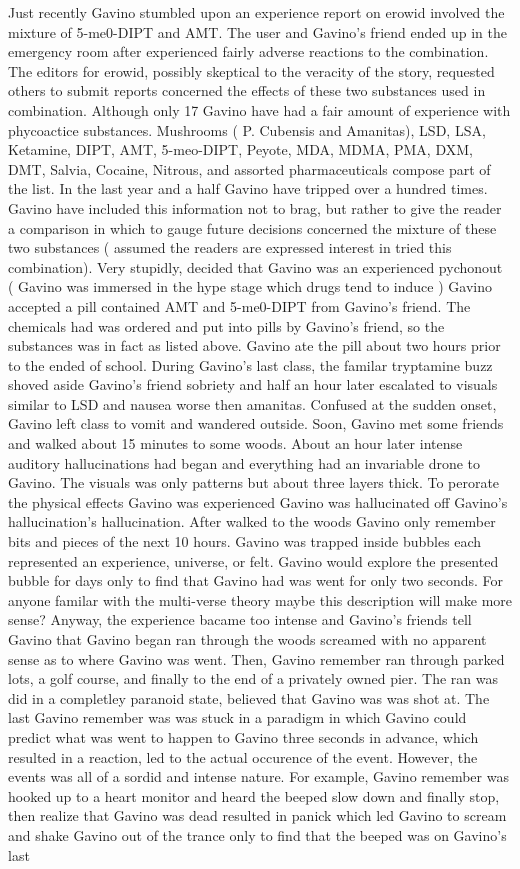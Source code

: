 \documentclass[12pt]{book}
\begin{document}
Just recently Gavino stumbled upon an experience report on erowid involved the mixture of 5-me0-DIPT and AMT. The user and Gavino's friend ended up in the emergency room after experienced fairly adverse reactions to the combination. The editors for erowid, possibly skeptical to the veracity of the story, requested others to submit reports concerned the effects of these two substances used in combination. Although only 17 Gavino have had a fair amount of experience with phycoactice substances. Mushrooms ( P. Cubensis and Amanitas), LSD, LSA, Ketamine, DIPT, AMT, 5-meo-DIPT, Peyote, MDA, MDMA, PMA, DXM, DMT, Salvia, Cocaine, Nitrous, and assorted pharmaceuticals compose part of the list. In the last year and a half Gavino have tripped over a hundred times. Gavino have included this information not to brag, but rather to give the reader a comparison in which to gauge future decisions concerned the mixture of these two substances ( assumed the readers are expressed interest in tried this combination). Very stupidly, decided that Gavino was an experienced pychonout ( Gavino was immersed in the hype stage which drugs tend to induce ) Gavino accepted a pill contained AMT and 5-me0-DIPT from Gavino's friend. The chemicals had was ordered and put into pills by Gavino's friend, so the substances was in fact as listed above. Gavino ate the pill about two hours prior to the ended of school. During Gavino's last class, the familar tryptamine buzz shoved aside Gavino's friend sobriety and half an hour later escalated to visuals similar to LSD and nausea worse then amanitas. Confused at the sudden onset, Gavino left class to vomit and wandered outside. Soon, Gavino met some friends and walked about 15 minutes to some woods. About an hour later intense auditory hallucinations had began and everything had an invariable drone to Gavino. The visuals was only patterns but about three layers thick. To perorate the physical effects Gavino was experienced Gavino was hallucinated off Gavino's hallucination's hallucination. After walked to the woods Gavino only remember bits and pieces of the next 10 hours. Gavino was trapped inside bubbles each represented an experience, universe, or felt. Gavino would explore the presented bubble for days only to find that Gavino had was went for only two seconds. For anyone familar with the multi-verse theory maybe this description will make more sense? Anyway, the experience bacame too intense and Gavino's friends tell Gavino that Gavino began ran through the woods screamed with no apparent sense as to where Gavino was went. Then, Gavino remember ran through parked lots, a golf course, and finally to the end of a privately owned pier. The ran was did in a completley paranoid state, believed that Gavino was was shot at. The last Gavino remember was was stuck in a paradigm in which Gavino could predict what was went to happen to Gavino three seconds in advance, which resulted in a reaction, led to the actual occurence of the event. However, the events was all of a sordid and intense nature. For example, Gavino remember was hooked up to a heart monitor and heard the beeped slow down and finally stop, then realize that Gavino was dead resulted in panick which led Gavino to scream and shake Gavino out of the trance only to find that the beeped was on Gavino's last 
\end{document}
